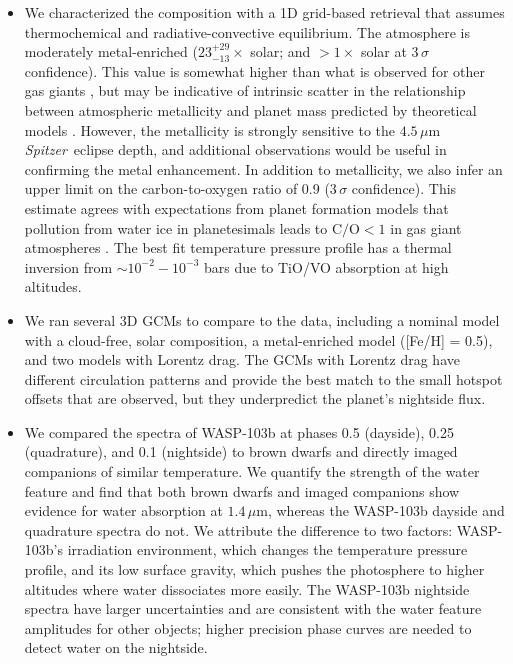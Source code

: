 \documentclass[twocolumn]{aastex61}
\newcommand{\project}[1]{\textsl{#1}}
\newcommand{\Spitzer}{\project{Spitzer}}
\begin{document}
\begin{itemize}
	\item{We characterized the composition with a 1D grid-based retrieval that assumes thermochemical and radiative-convective equilibrium. The atmosphere is moderately metal-enriched ($23^{+29}_{-13}\times$ solar; and $>1\times$ solar at $3\,\sigma$ confidence). This value is somewhat higher than what is observed for other gas giants \citep[e.g.][]{wong04, kreidberg14b}, but may be indicative of intrinsic scatter in the relationship between atmospheric metallicity and planet mass predicted by theoretical models \citep{fortney13, mordasini16}. However, the metallicity is strongly sensitive to the $4.5\,\mu$m \Spitzer\ eclipse depth, and additional observations would be useful in confirming the metal enhancement.  In addition to metallicity, we also infer an upper limit on the carbon-to-oxygen ratio of 0.9 ($3\,\sigma$ confidence). This estimate agrees with expectations from planet formation models that pollution from water ice in planetesimals leads to $\mathrm{C/O} < 1$ in gas giant atmospheres \citep{mordasini16, espinoza17}. The best fit temperature pressure profile has a thermal inversion from $\sim10^{-2} - 10^{-3}$ bars due to TiO/VO absorption at high altitudes.} 
	\item{We ran several 3D GCMs to compare to the data, including a nominal model with a cloud-free, solar composition, a metal-enriched model ([Fe/H] = 0.5), and two models with Lorentz drag. The GCMs with Lorentz drag have different circulation patterns and provide the best match to the small hotspot offsets that are observed, but they underpredict the planet's nightside flux.}
	\item{We compared the spectra of WASP-103b at phases 0.5 (dayside), 0.25 (quadrature), and 0.1 (nightside) to brown dwarfs and directly imaged companions of similar temperature. We quantify the strength of the water feature and find that both brown dwarfs and imaged companions show evidence for water absorption at $1.4\,\mu$m, whereas the WASP-103b dayside and quadrature spectra do not. We attribute the difference to two factors: WASP-103b's irradiation environment, which changes the temperature pressure profile, and its low surface gravity, which pushes the photosphere to higher altitudes where water dissociates more easily. The WASP-103b nightside spectra have larger uncertainties and are consistent with the water feature amplitudes for other objects; higher precision phase curves are needed to detect water on the nightside.}
\end{itemize}
\end{document}
